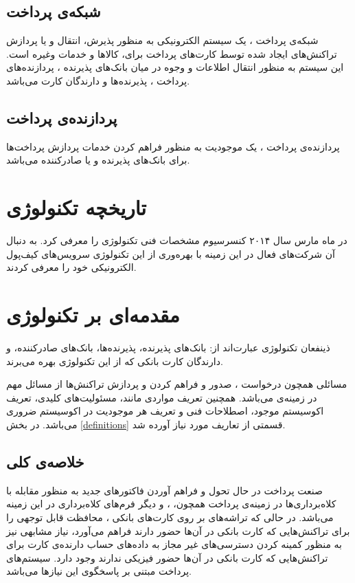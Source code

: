 \documentclass[oneside]{report}
\begin{document}
\subsection{شبکه‌ی پرداخت}
شبکه‌ی پرداخت 
			  			 				، 
			  			 				یک سیستم الکترونیکی به منظور پذیرش، انتقال و یا پردازش تراکنش‌های ایجاد شده توسط کارت‌های پرداخت برای، کالاها و خدمات وغیره است. این سیستم به منظور انتقال اطلاعات و وجوه در میان بانک‌های پذیرنده ، پردازنده‌های پرداخت ، پذیرنده‌ها و دارندگان کارت می‌باشد. 

\subsection{پردازنده‌ی پرداخت}			  			 							  			 				
پردازنده‌ی پرداخت 
			 	، 
یک موجودیت به منظور فراهم کردن خدمات پردازش پرداخت‌ها برای بانک‌های پذیرنده و یا صادر‌کننده می‌باشد. 
		
\section{ تاریخچه تکنولوژی     {\large  {}}}
					در ماه مارس سال ۲۰۱۴ کنسرسیوم 
					{\normalsize {}} 
					مشخصات فنی تکنولوژی 
					را معرفی کرد. به دنبال آن شرکت‌های فعال در این زمینه با بهره‌وری از این تکنولوژی سرویس‌های کیف‌پول الکترونیکی خود را معرفی کردند.

\section{ مقدمه‌ای بر تکنولوژی     {\large  {}} }					
ذینفعان تکنولوژی 
{\normalsize  {}}			
عبارت‌اند از:‌ بانک‌های پذیرنده،  پذیرنده‌ها، بانک‌های صادرکننده،  و دارندگان کارت بانکی که از این تکنولوژی بهره می‌برند. 

مسائلی همچون درخواست
{\normalsize  {}}،   صدور و فراهم کردن
{\normalsize  {}}
و پردازش تراکنش‌ها از مسائل مهم در زمینه‌ی 
{\normalsize  {}}
می‌باشد. همچنین تعریف مواردی مانند،  مسئولیت‌های کلیدی،   تعریف اکوسیستم موجود، اصطلاحات فنی و تعریف هر موجودیت در اکوسیستم ضروری می‌باشد.  در بخش 
\ref{definitions}
قسمتی از تعاریف مورد نیاز آورده شد. 

\subsection{خلاصه‌ی کلی}
صنعت پرداخت در حال تحول و فراهم آوردن فاکتورهای جدید به منظور مقابله با کلاه‌برداری‌ها در زمینه‌ی پرداخت همچون،
					{\normalsize {}} ، 
							{\normalsize {}}
	و دیگر فرم‌های کلاه‌برداری در این زمینه می‌باشد.  در حالی که تراشه‌های 
						{\normalsize {}}
بر روی کارت‌های بانکی ، محافظت قابل توجهی را برای تراکنش‌هایی که کارت بانکی در آن‌ها حضور دارند فراهم می‌آورد، نیاز مشابهی نیز به منظور کمینه کردن دسترسی‌های غیر مجاز به داده‌های حساب دارنده‌ی کارت برای تراکنش‌هایی که کارت بانکی در آن‌ها حضور فیزیکی ندارند وجود دارد.  سیستم‌های پرداخت مبتنی بر
					{\normalsize {}}
پاسخگوی این نیازها می‌باشد.
\end{document}
